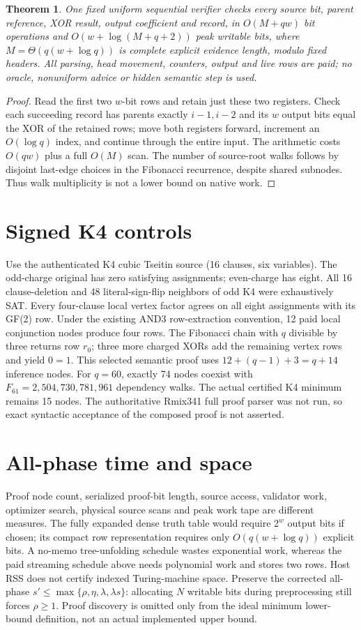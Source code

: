 \documentclass[11pt]{article}
\newtheorem{theorem}{Theorem}
\begin{document}
\begin{theorem}
One fixed uniform sequential verifier checks every source bit, parent reference, XOR result, output coefficient and record, in $O(M+qw)$ bit operations and $O(w+\log(M+q+2))$ peak writable bits, where $M=\Theta(q(w+\log q))$ is complete explicit evidence length, modulo fixed headers. All parsing, head movement, counters, output and live rows are paid; no oracle, nonuniform advice or hidden semantic step is used.
\end{theorem}
\begin{proof}
Read the first two $w$-bit rows and retain just these two registers. Check each succeeding record has parents exactly $i-1,i-2$ and its $w$ output bits equal the XOR of the retained rows; move both registers forward, increment an $O(\log q)$ index, and continue through the entire input. The arithmetic costs $O(qw)$ plus a full $O(M)$ scan. The number of source-root walks follows by disjoint last-edge choices in the Fibonacci recurrence, despite shared subnodes. Thus walk multiplicity is not a lower bound on native work.
\end{proof}

\section*{Signed K4 controls}
Use the authenticated K4 cubic Tseitin source (16 clauses, six variables). The odd-charge original has zero satisfying assignments; even-charge has eight. All 16 clause-deletion and 48 literal-sign-flip neighbors of odd K4 were exhaustively SAT. Every four-clause local vertex factor agrees on all eight assignments with its GF(2) row. Under the existing AND3 row-extraction convention, 12 paid local conjunction nodes produce four rows. The Fibonacci chain with $q$ divisible by three returns row $r_0$; three more charged XORs add the remaining vertex rows and yield $0=1$. This selected semantic proof uses $12+(q-1)+3=q+14$ inference nodes. For $q=60$, exactly 74 nodes coexist with $F_{61}=2,504,730,781,961$ dependency walks. The actual certified K4 minimum remains 15 nodes. The authoritative Rmix341 full proof parser was not run, so exact syntactic acceptance of the composed proof is not asserted.

\section*{All-phase time and space}
Proof node count, serialized proof-bit length, source access, validator work, optimizer search, physical source scans and peak work tape are different measures. The fully expanded dense truth table would require $2^w$ output bits if chosen; its compact row representation requires only $O(q(w+\log q))$ explicit bits. A no-memo tree-unfolding schedule wastes exponential work, whereas the paid streaming schedule above needs polynomial work and stores two rows. Host RSS does not certify indexed Turing-machine space. Preserve the corrected all-phase $s'\le\max\{\rho,\eta,\lambda,\lambda s\}$: allocating $N$ writable bits during preprocessing still forces $\rho\ge1$. Proof discovery is omitted only from the ideal minimum lower-bound definition, not an actual implemented upper bound.
\end{document}
